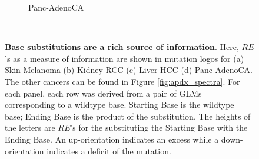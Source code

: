 \begin{figure}[ht!]
\begin{subfigure}{.5\textwidth}
    \caption{Panc-AdenoCA}
    \label{fig:spectra_panc_adenoca}
    \end{subfigure} \\
    \vspace{0.2cm}
    \caption{\textbf{Base substitutions are a rich source of information}. Here, $RE$'s as a measure of information are shown in mutation logos for (a) Skin-Melanoma (b) Kidney-RCC (c) Liver-HCC (d) Panc-AdenoCA. The other cancers can be found in Figure \ref{fig:apdx_spectra}. For each panel, each row was derived from a pair of GLMs corresponding to a wildtype base. Starting Base is the wildtype base; Ending Base is the product of the substitution. The heights of the letters are $RE$'s for the substituting the Starting Base with the Ending Base. An up-orientation indicates an excess while a down-orientation indicates a deficit of the mutation.}
    \label{fig:spectra}
\end{figure}